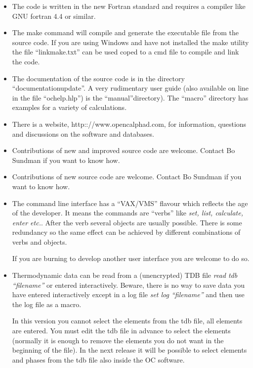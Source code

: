 \documentclass[12pt]{article}
\begin{document}
\begin{itemize}
\item The code is written in the new Fortran standard and requires 
a compiler like GNU fortran 4.4 or similar.

\item The make command will compile and generate the executable file
from the source code.  If you are using Windows and have not installed
the make utility the file ``linkmake.txt'' can be used coped to a cmd
file to compile and link the code.

\item The documentation of the source code is in the directory
``documentationupdate''.  A very rudimentary user guide (also
available on line in the file ``ochelp.hlp'') is the ``manual''directory).
The ``macro'' directory has examples for a variety of calculations.

\item There is a website, http:://www.opencalphad.com, for
information, questions and discussions on the software and databases.

\item Contributions of new and improved source code are welcome.
Contact Bo Sundman if you want to know how.

\item Contributions of new source code are welcome.  Contact Bo
Sundman if you want to know how.

\item The command line interface has a ``VAX/VMS'' flavour which reflects the
age of the developer.  It means the commands are ``verbs'' like {\em
set, list, calculate, enter etc.}.  After the verb several objects are
usually possible.  There is some redundancy so the same effect can be
achieved by different combinations of verbs and objects.

If you are burning to develop another user interface you are welcome
to do so.

\item Thermodynamic data can be read from a (unencrypted) TDB file
{\em read tdb ``filename''} or entered interactively.  Beware, there is
no way to save data you have entered interactively except in a log file
{\em set log ``filename''} and then use the log file as a macro.

In this version you cannot select the elements from the tdb file, all
elements are entered.  You must edit the tdb file in advance to select
the elements (normally it is enough to remove the elements you do not
want in the beginning of the file).  In the next release it will be
possible to select elements and phases from the tdb file also inside
the OC software.


\end{itemize}
\end{document}

